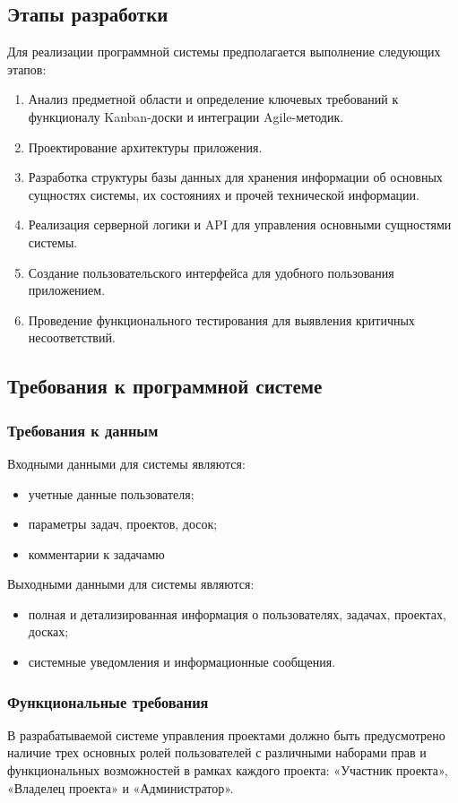 \subsection{Этапы разработки}

Для реализации программной системы предполагается выполнение следующих этапов:
\begin{enumerate}
	\item Анализ предметной области и определение ключевых требований к функционалу Kanban-доски и интеграции Agile-методик.
	\item Проектирование архитектуры приложения.
	\item Разработка структуры базы данных для хранения информации об основных сущностях системы, их состояниях и прочей технической информации.
	\item Реализация серверной логики и API для управления основными сущностями системы.
	\item Создание пользовательского интерфейса для удобного пользования приложением.
	\item Проведение функционального тестирования для выявления критичных несоответствий.
\end{enumerate}

\subsection{Требования к программной системе}

\subsubsection{Требования к данным}
Входными данными для системы являются:
\begin{itemize}
	\item учетные данные пользователя;
	\item параметры задач, проектов, досок;
	\item комментарии к задачамю
\end{itemize}
Выходными данными для системы являются:
\begin{itemize}
	\item полная и детализированная информация о пользователях, задачах, проектах, досках;
	\item системные уведомления и информационные сообщения.
\end{itemize}

\subsubsection{Функциональные требования}
В разрабатываемой системе управления проектами должно быть предусмотрено наличие трех основных ролей пользователей с различными наборами прав и функциональных возможностей в рамках каждого проекта: «Участник проекта», «Владелец проекта» и «Администратор».

